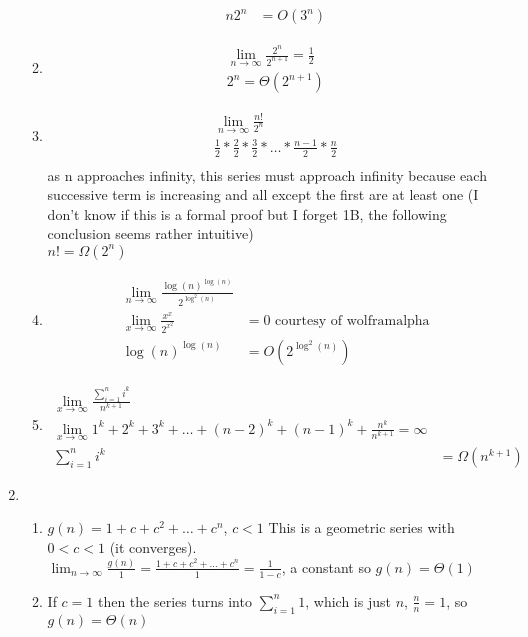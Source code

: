 \documentclass[11pt]{article}
\begin{document}
\begin{enumerate}
\begin{enumerate}
\begin{align*}
n2^n&=O(3^n)
\end{align*}
\item
\begin{align*}
\lim_{n\to\infty} \frac{2^n}{2^{n+1}}=\frac{1}{2}\\
2^n=\Theta(2^{n+1})
\end{align*}
\item
\begin{align*}
\lim_{n\to\infty} \frac{n!}{2^n}\\
\frac{1}{2}*\frac{2}{2}*\frac{3}{2}*\text{…}*\frac{n-1}{2}*\frac{n}{2}\\
\end{align*}
as n approaches infinity, this series must approach infinity because each successive term is
increasing and all except the first are at least one (I don't know if this is a formal proof but I forget 1B, the following conclusion seems rather intuitive)\\
$n!=\Omega(2^n)$
\item
\begin{align*}
\lim_{n\to\infty} \frac{\log(n)^{\log(n)}}{2^{\log^2(n)}}\\
\lim_{x\to\infty} \frac{x^x}{2^{x^2}}&=0 \text{ courtesy of wolframalpha}\\
\log(n)^{\log(n)}&=O(2^{\log^2(n)})
\end{align*}
\item
\begin{align*}
\lim_{x\to\infty} \frac{\sum_{i=1}^n i^k}{n^{k+1}}\\
\lim_{x\to\infty} 1^k+2^k+3^k+…+(n-2)^k+(n-1)^k+\frac{n^k}{n^{k+1}}=\infty\\
\sum_{i=1}^n i^k&=\Omega(n^{k+1})
\end{align*}
\end{enumerate}

\newpage

\item 


\begin{enumerate}

\item 
$g(n)=1+c+c^2+…+c^n$, $c<1$
This is a geometric series with $0<c<1$ (it converges). \\
$ \lim_{n\to\infty} \frac{g(n)}{1} = \frac{1+c+c^2+…+c^n}{1}=\frac{1}{1-c}$, a constant so $g(n)=\Theta(1)$

\item 
If $c=1$ then the series turns into $\sum_{i=1}^n 1$, which is just $n$, $\frac{n}{n}=1$, so $g(n)=\Theta(n)$


\end{enumerate}
\end{enumerate}
\end{document}
